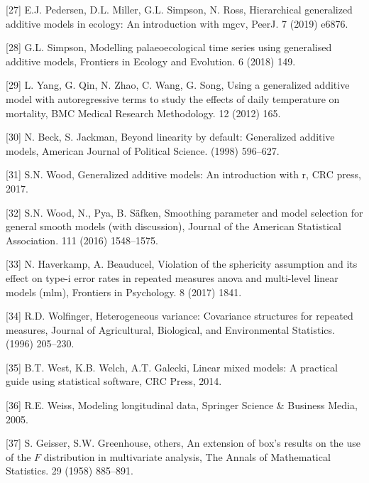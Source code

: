 \documentclass[
]{article}
\begin{document}
\leavevmode\hypertarget{ref-pedersen2019}{}%
{[}27{]} E.J. Pedersen, D.L. Miller, G.L. Simpson, N. Ross, Hierarchical generalized additive models in ecology: An introduction with mgcv, PeerJ. 7 (2019) e6876.

\leavevmode\hypertarget{ref-simpson2018}{}%
{[}28{]} G.L. Simpson, Modelling palaeoecological time series using generalised additive models, Frontiers in Ecology and Evolution. 6 (2018) 149.

\leavevmode\hypertarget{ref-yang2012}{}%
{[}29{]} L. Yang, G. Qin, N. Zhao, C. Wang, G. Song, Using a generalized additive model with autoregressive terms to study the effects of daily temperature on mortality, BMC Medical Research Methodology. 12 (2012) 165.

\leavevmode\hypertarget{ref-beck1998}{}%
{[}30{]} N. Beck, S. Jackman, Beyond linearity by default: Generalized additive models, American Journal of Political Science. (1998) 596--627.

\leavevmode\hypertarget{ref-wood2017}{}%
{[}31{]} S.N. Wood, Generalized additive models: An introduction with r, CRC press, 2017.

\leavevmode\hypertarget{ref-wood2016}{}%
{[}32{]} S.N. Wood, N., Pya, B. Säfken, Smoothing parameter and model selection for general smooth models (with discussion), Journal of the American Statistical Association. 111 (2016) 1548--1575.

\leavevmode\hypertarget{ref-haverkamp2017}{}%
{[}33{]} N. Haverkamp, A. Beauducel, Violation of the sphericity assumption and its effect on type-i error rates in repeated measures anova and multi-level linear models (mlm), Frontiers in Psychology. 8 (2017) 1841.

\leavevmode\hypertarget{ref-wolfinger1996}{}%
{[}34{]} R.D. Wolfinger, Heterogeneous variance: Covariance structures for repeated measures, Journal of Agricultural, Biological, and Environmental Statistics. (1996) 205--230.

\leavevmode\hypertarget{ref-west2014}{}%
{[}35{]} B.T. West, K.B. Welch, A.T. Galecki, Linear mixed models: A practical guide using statistical software, CRC Press, 2014.

\leavevmode\hypertarget{ref-weiss2005}{}%
{[}36{]} R.E. Weiss, Modeling longitudinal data, Springer Science \& Business Media, 2005.

\leavevmode\hypertarget{ref-geisser1958}{}%
{[}37{]} S. Geisser, S.W. Greenhouse, others, An extension of box's results on the use of the \(F\) distribution in multivariate analysis, The Annals of Mathematical Statistics. 29 (1958) 885--891.
\end{document}
